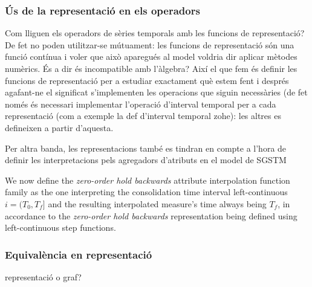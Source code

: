 







\subsubsection{Ús de la representació en els operadors}

\todo{}

Com lliguen els operadors de sèries temporals amb les funcions de
representació? De fet no poden utilitzar-se mútuament: les funcions de
representació són una funció contínua i voler que això aparegués al
model voldria dir aplicar mètodes numèrics. És a dir és incompatible
amb l'àlgebra? Així el que fem és definir les funcions de
representació per a estudiar exactament què estem fent i després
agafant-ne el significat s'implementen les operacions que siguin
necessàries (de fet només és necessari implementar l'operació
d'interval temporal per a cada representació (com a exemple la def d'interval temporal zohe): les altres es defineixen
a partir d'aquesta.

Per  altra banda,  les representacions  també es  tindran en  compte a
l'hora de definir les interpretacions pels agregadors d'atributs en el
model de SGSTM 

We now define the \emph{zero-order hold backwards} attribute
interpolation function family as the one interpreting the
consolidation time interval left-continuous $i=(T_0,T_f]$ and the
resulting interpolated measure's time always being $T_f$, in
accordance to the \emph{zero-order hold backwards} representation
being defined using left-continuous step functions.  


\subsubsection{Equivalència en representació}
representació o graf?

